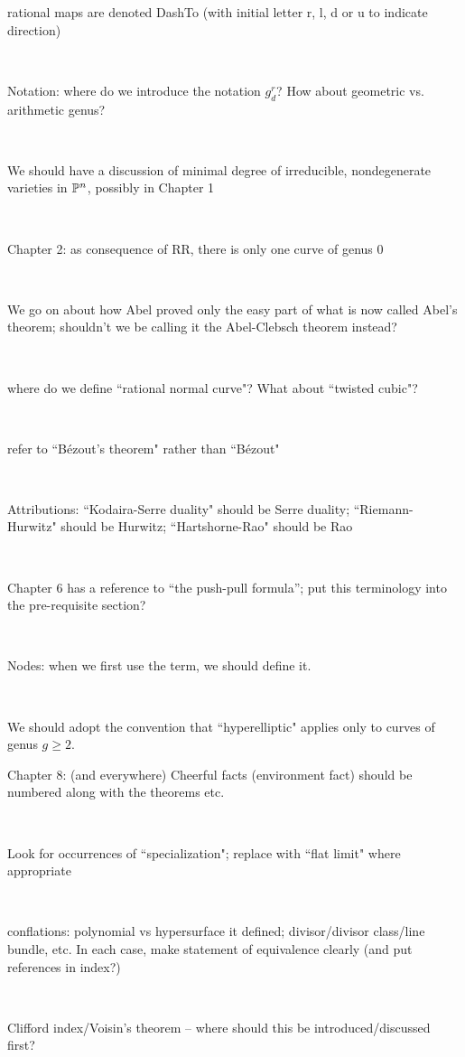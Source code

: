 \documentclass[12pt, leqno]{book}
\begin{document}
rational maps are denoted DashTo (with initial letter r, l, d or u to indicate direction)

\

Notation: where do we introduce the notation $g^r_d$? How about geometric vs. arithmetic genus?

\

We should have a discussion of minimal degree of irreducible, nondegenerate varieties in $\PP^n$, possibly in Chapter 1

\

Chapter 2: as consequence of RR, there is only one curve of genus 0

\

We go on about how Abel proved only the easy part of what is now called Abel's theorem; shouldn't we be calling it the Abel-Clebsch theorem instead?

\

where do we define ``rational normal curve"? What about ``twisted cubic"?

\

refer to ``B\' ezout's theorem" rather than ``B\' ezout"

\

Attributions: ``Kodaira-Serre duality" should be Serre duality; ``Riemann-Hurwitz" should be Hurwitz; ``Hartshorne-Rao" should be Rao

\ 

Chapter 6 has a reference to ``the push-pull formula''; put this terminology into the pre-requisite section?

\

Nodes: when we first use the term, we should define it.

\

We should adopt the convention that ``hyperelliptic" applies only to curves of genus $g \geq 2$.


Chapter 8: (and everywhere) Cheerful facts (environment fact) should be numbered along with the theorems etc.

\

Look for occurrences of ``specialization"; replace with ``flat limit" where appropriate

\

conflations: polynomial vs hypersurface it defined; divisor/divisor class/line bundle, etc. In each case, make statement of equivalence clearly (and put references in index?)

\

Clifford index/Voisin's theorem -- where should this be introduced/discussed first?
\end{document}
